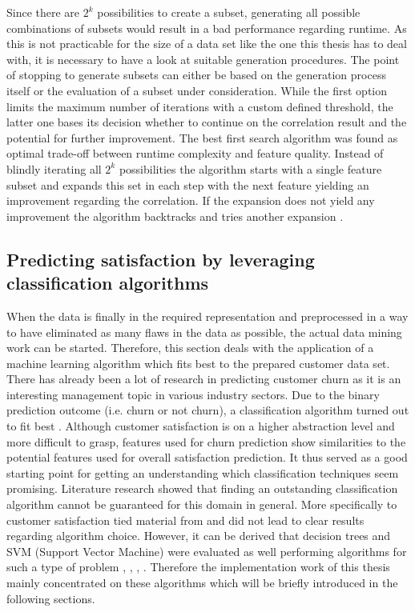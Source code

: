 Since there are $2^k$ possibilities to create a subset, generating all possible combinations of subsets would result in a bad performance regarding runtime. As this is not practicable for the size of a data set like the one this thesis has to deal with, it is necessary to have a look at suitable generation procedures. The point of stopping to generate subsets can either be based on the generation process itself or the evaluation of a subset under consideration. While the first option limits the maximum number of iterations with a custom defined threshold, the latter one bases its decision whether to continue on the correlation result and the potential for further improvement. The best first search algorithm was found as optimal trade-off between runtime complexity and feature quality. Instead of blindly iterating all $2^k$ possibilities the algorithm starts with a single feature subset and expands this set in each step with the next feature yielding an improvement regarding the correlation. If the expansion does not yield any improvement the algorithm backtracks and tries another expansion \cite{hall2000correlation} \cite{dash1997feature}.

\subsection{Predicting satisfaction by leveraging classification algorithms}
\label{ssec:classificationAlgorithms}
When the data is finally in the required representation and preprocessed in a way to have eliminated as many flaws in the data as possible, the actual data mining work can be started. Therefore, this section deals with the application of a machine learning algorithm which fits best to the prepared customer data set. There has already been a lot of research in predicting customer churn as it is an interesting management topic in various industry sectors. Due to the binary prediction outcome (i.e. churn or not churn), a classification algorithm turned out to fit best \cite{vafeiadis2015comparison} \cite{xie2009customer}. Although customer satisfaction is on a higher abstraction level and more difficult to grasp, features used for churn prediction show similarities to the potential features used for overall satisfaction prediction. It thus served as a good starting point for getting an understanding which classification techniques seem promising. Literature research showed that finding an outstanding classification algorithm cannot be guaranteed for this domain in general. More specifically to customer satisfaction tied material from \cite{mozer2000predicting} and \cite{meinzer2016can} did not lead to clear results regarding algorithm choice. However, it can be derived that decision trees and SVM (Support Vector Machine) were evaluated as well performing algorithms for such a type of problem \cite{vafeiadis2015comparison}, \cite{xie2009customer}, \cite{mozer2000predicting}, \cite{meinzer2016can}. Therefore the implementation work of this thesis mainly concentrated on these algorithms which will be briefly introduced in the following sections.

